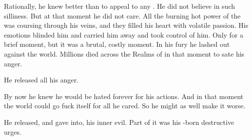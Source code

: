 Rationally, he knew better than to appeal to any . 
He did not believe in such silliness. 
But at that moment he did not care. 
All the burning hot power of the \xss{} was coursing through his veins, and they filled his heart with volatile passion. 
His emotions blinded him and carried him away and took control of him. 
Only for a brief moment, but it was a brutal, costly moment. 
In his fury he lashed out against the world.
Millions died across the Realms of \Miith{} in that moment to sate his anger. 

He released all his anger. 


By now he knew he would be hated forever for his actions. 
And in that moment the world could go fuck itself for all he cared. 
So he might as well make it worse. 


He released, and gave into, his inner evil. 
Part of it was his \xs-born destructive urges. 

